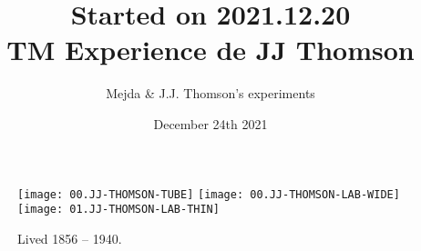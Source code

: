 \documentclass[14pt]{article}
\title{ Started on 2021.12.20 \\ TM Experience de JJ Thomson}
\author{Mejda \& J.J. Thomson's experiments }
\date{December 24th 2021}
\begin{document}
\maketitle
\begin{figure}[bh] 
        \centering
        \texttt{[image: 00.JJ-THOMSON-TUBE]} 
        \texttt{[image: 00.JJ-THOMSON-LAB-WIDE]}
        \texttt{[image: 01.JJ-THOMSON-LAB-THIN]}
        \label{fig:img1}
        \caption{Lived 1856 – 1940. }
    \end{figure}


%
\end{document}

